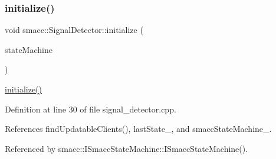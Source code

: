 \subsubsection{\texorpdfstring{initialize()}{initialize()}}
{\footnotesize\ttfamily void smacc\+::\+Signal\+Detector\+::initialize (\begin{DoxyParamCaption}\item[{\hyperlink{classsmacc_1_1ISmaccStateMachine}{I\+Smacc\+State\+Machine} $\ast$}]{state\+Machine }\end{DoxyParamCaption})}

\hyperlink{classsmacc_1_1SignalDetector_a91ab3cd92d8095cdaf8610b50731f04b}{initialize()} 

Definition at line 30 of file signal\+\_\+detector.\+cpp.



References find\+Updatable\+Clients(), last\+State\+\_\+, and smacc\+State\+Machine\+\_\+.



Referenced by smacc\+::\+I\+Smacc\+State\+Machine\+::\+I\+Smacc\+State\+Machine().


